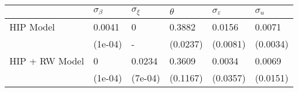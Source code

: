 
\begin{tabular}{llllll}
\toprule
  & $\sigma_\beta$ & $\sigma_\xi$ & $\theta$ & $\sigma_\varepsilon$ & $\sigma_u$\\
\midrule
HIP Model & 0.0041 & 0 & 0.3882 & 0.0156 & 0.0071\\
 & (1e-04) & - & (0.0237) & (0.0081) & (0.0034)\\
HIP + RW Model & 0 & 0.0234 & 0.3609 & 0.0034 & 0.0069\\
 & (1e-04) & (7e-04) & (0.1167) & (0.0357) & (0.0151)\\
\bottomrule
\end{tabular}
